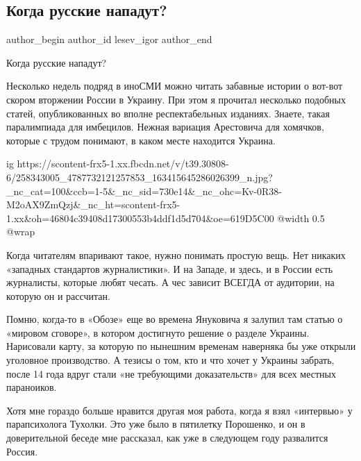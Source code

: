  
 
 
 
 
 
\subsection{Когда русские нападут?}
\label{sec:17_11_2021.fb.lesev_igor.1.kogda_russkie_napadut}
 
\ifcmt
 author_begin
   author_id lesev_igor
 author_end
\fi

Когда русские нападут?

Несколько недель подряд в иноСМИ можно читать забавные истории о вот-вот скором
вторжении России в Украину. При этом я прочитал несколько подобных статей,
опубликованных во вполне респектабельных изданиях. Знаете, такая паралимпиада
для имбецилов. Нежная вариация Арестовича для хомячков, которые с трудом
понимают, в каком месте находится Украина.

\ifcmt
  ig https://scontent-frx5-1.xx.fbcdn.net/v/t39.30808-6/258343005_4787732121257853_163415645286026399_n.jpg?_nc_cat=100&ccb=1-5&_nc_sid=730e14&_nc_ohc=Kv-0R38-M2oAX9ZmQzj&_nc_ht=scontent-frx5-1.xx&oh=46804c39408d17300553b4ddf1d5d704&oe=619D5C00
  @width 0.5
  @wrap 
\fi

Когда читателям впаривают такое, нужно понимать простую вещь. Нет никаких
«западных стандартов журналистики». И на Западе, и здесь, и в России есть
журналисты, которые любят чесать. А чес зависит ВСЕГДА от аудитории, на которую
он и рассчитан.

Помню, когда-то в «Обозе» еще во времена Януковича я залупил там статью о
«мировом сговоре», в котором достигнуто решение о разделе Украины. Нарисовали
карту, за которую по нынешним временам наверняка бы уже открыли уголовное
производство. А тезисы о том, кто и что хочет у Украины забрать, после 14 года
вдруг стали «не требующими доказательств» для всех местных параноиков.

Хотя мне гораздо больше нравится другая моя работа, когда я взял «интервью» у
парапсихолога Тухолки. Это уже было в пятилетку Порошенко, и он в доверительной
беседе мне рассказал, как уже в следующем году развалится Россия.

